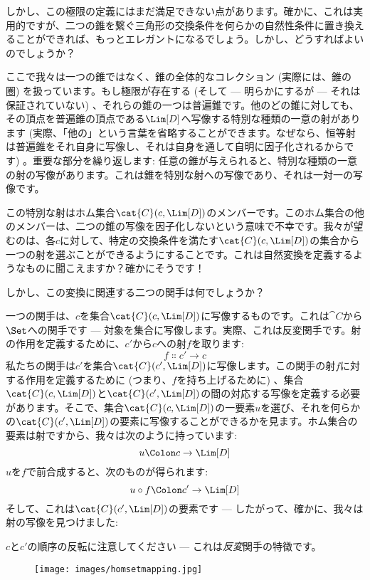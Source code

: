 しかし、この極限の定義にはまだ満足できない点があります。確かに、これは実用的ですが、二つの錐を繋ぐ三角形の交換条件を何らかの自然性条件に置き換えることができれば、もっとエレガントになるでしょう。しかし、どうすればよいのでしょうか？

ここで我々は一つの錐ではなく、錐の全体的なコレクション (実際には、錐の圏) を扱っています。もし極限が存在する (そして --- 明らかにするが --- それは保証されていない) 、それらの錐の一つは普遍錐です。他のどの錐に対しても、その頂点を普遍錐の頂点である$\Lim[D]$へ写像する特別な種類の一意の射があります (実際、「他の」という言葉を省略することができます。なぜなら、恒等射は普遍錐をそれ自身に写像し、それは自身を通して自明に因子化されるからです) 。重要な部分を繰り返します: 任意の錐が与えられると、特別な種類の一意の射の写像があります。これは錐を特別な射への写像であり、それは一対一の写像です。

この特別な射はホム集合$\cat{C}(c, \Lim[D])$のメンバーです。このホム集合の他のメンバーは、二つの錐の写像を因子化しないという意味で不幸です。我々が望むのは、各$c$に対して、特定の交換条件を満たす$\cat{C}(c, \Lim[D])$の集合から一つの射を選ぶことができるようにすることです。これは自然変換を定義するようなものに聞こえますか？確かにそうです！

しかし、この変換に関連する二つの関手は何でしょうか？

一つの関手は、$c$を集合$\cat{C}(c, \Lim[D])$に写像するものです。これは$\cat{C}$から$\Set$への関手です --- 対象を集合に写像します。実際、これは反変関手です。射の作用を定義するために、$c'$から$c$への射$f$を取ります: 
\[f \Colon c' \to c\]
私たちの関手は$c'$を集合$\cat{C}(c', \Lim[D])$に写像します。この関手の射$f$に対する作用を定義するために (つまり、$f$を持ち上げるために) 、集合$\cat{C}(c, \Lim[D])$と$\cat{C}(c', \Lim[D])$の間の対応する写像を定義する必要があります。そこで、集合$\cat{C}(c, \Lim[D])$の一要素$u$を選び、それを何らかの$\cat{C}(c', \Lim[D])$の要素に写像することができるかを見ます。ホム集合の要素は射ですから、我々は次のように持っています: 
\[u \Colon c \to \Lim[D]\]
$u$を$f$で前合成すると、次のものが得られます: 
\[u \circ f \Colon c' \to \Lim[D]\]
そして、これは$\cat{C}(c', \Lim[D])$の要素です --- したがって、確かに、我々は射の写像を見つけました: 

$c$と$c'$の順序の反転に注意してください --- これは\emph{反変}関手の特徴です。

\begin{figure}[H]
  \centering
  \texttt{[image: images/homsetmapping.jpg]}
\end{figure}

